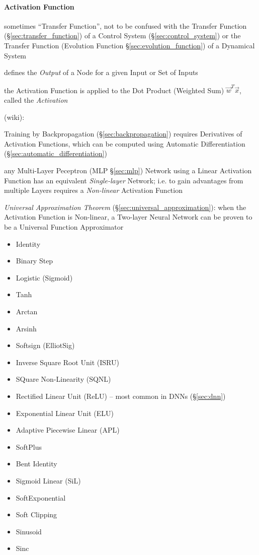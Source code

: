 \paragraph{Activation Function}\label{sec:activation_function}\hfill

sometimes ``Transfer Function'', not to be confused with the Transfer Function
(\S\ref{sec:transfer_function}) of a Control System (\S\ref{sec:control_system})
or the Transfer Function (Evolution Function \S\ref{sec:evolution_function}) of
a Dynamical System

defines the \emph{Output} of a Node for a given Input or Set of Inputs

the Activation Function is applied to the Dot Product (Weighted Sum)
$\vec{w}^T \vec{x}$, called the \emph{Activation}

(wiki):

Training by Backpropagation (\S\ref{sec:backpropagation}) requires Derivatives
of Activation Functions, which can be computed using Automatic Differentiation
(\S\ref{sec:automatic_differentiation})

any Multi-Layer Peceptron (MLP \S\ref{sec:mlp}) Network using a Linear
Activation Function has an equivalent \emph{Single-layer} Network; i.e. to gain
advantages from multiple Layers requires a \emph{Non-linear} Activation Function

\emph{Universal Approximation Theorem} (\S\ref{sec:universal_approximation}):
when the Activation Function is Non-linear, a Two-layer Neural Network can be
proven to be a Universal Function Approximator

\begin{itemize}
  \item Identity
  \item Binary Step
  \item Logistic (Sigmoid)
  \item Tanh
  \item Arctan
  \item Arsinh
  \item Softsign (ElliotSig)
  \item Inverse Square Root Unit (ISRU)
  \item SQuare Non-Linearity (SQNL)
  \item Rectified Linear Unit (ReLU) -- most common in DNNs (\S\ref{sec:dnn})
  \item Exponential Linear Unit (ELU)
  \item Adaptive Piecewise Linear (APL)
  \item SoftPlus
  \item Bent Identity
  \item Sigmoid Linear (SiL)
  \item SoftExponential
  \item Soft Clipping
  \item Sinusoid
  \item Sinc
\end{itemize}

